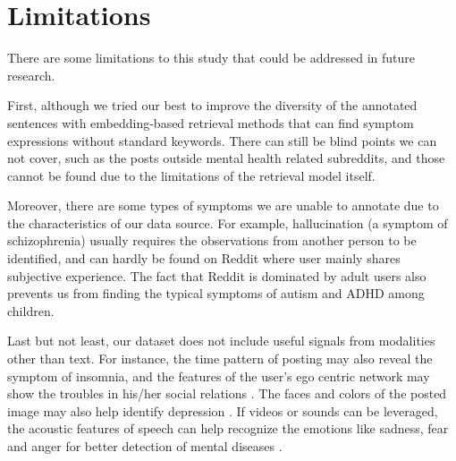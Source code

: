 \section*{Limitations}
\label{sec:limitations}
There are some limitations to this study that could be addressed in future research. 

First, although we tried our best to improve the diversity of the annotated sentences with embedding-based retrieval methods that can find symptom expressions without standard keywords. There can still be blind points we can not cover, such as the posts outside mental health related subreddits, and those cannot be found due to the limitations of the retrieval model itself.

Moreover, there are some types of symptoms we are unable to annotate due to the characteristics of our data source. For example, hallucination (a symptom of schizophrenia) usually requires the observations from another person to be identified, and can hardly be found on Reddit where user mainly shares subjective experience. The fact that Reddit is dominated by adult users \citep{gjurkovic2021pandora} also prevents us from finding the typical symptoms of autism and ADHD among children. 

Last but not least, our dataset does not include useful signals from modalities other than text. For instance, the time pattern of posting may also reveal the symptom of insomnia, and the features of the user's ego centric network may show the troubles in his/her social relations \citep{de2013predicting}. The faces and colors of the posted image may also help identify depression \citep{gui2019cooperative}. If videos or sounds can be leveraged, the acoustic features of speech can help recognize the emotions like sadness, fear and anger \citep{Busso2008IEMOCAPIE} for better detection of mental diseases \citep{wu2022climate}. 
